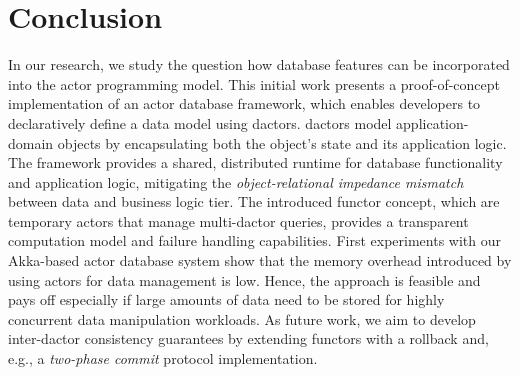 
\section{Conclusion}\label{sec:conclusion}

In our research, we study the question how database features can be incorporated into the actor programming model. This initial work presents a proof-of-concept implementation of an actor database framework, which enables developers to declaratively define a data model using \glspl{dactor}.
\Glspl{dactor} model application-domain objects by encapsulating both the object's state and its application logic.
The framework provides a shared, distributed runtime for database functionality and application logic, mitigating the \textit{object-relational impedance mismatch} between data and business logic tier.
The introduced \gls{functor} concept, which are temporary actors that manage multi-\gls{dactor} queries, provides a transparent computation model and failure handling capabilities.
First experiments with our Akka-based actor database system show that the memory overhead introduced by using actors for data management is low.
Hence, the approach is feasible and pays off especially if large amounts of data need to be stored for highly concurrent data manipulation workloads.
As future work, we aim to develop inter-\gls{dactor} consistency guarantees by extending \glspl{functor} with a rollback and, e.g., a \textit{two-phase commit} protocol implementation.
